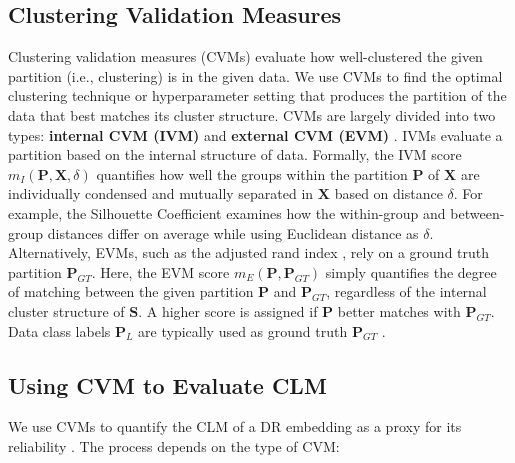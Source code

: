 


\subsection{Clustering Validation Measures}

\label{sec:cvmdesc}

Clustering validation measures (CVMs) evaluate how well-clustered the given partition (i.e., clustering) is in the given data. 
We use CVMs to find the optimal clustering technique or hyperparameter setting that produces the partition of the data that best matches its cluster structure.
CVMs are largely divided into two types: \textbf{internal CVM (IVM)}  \cite{liu10icdm, liu13tsmcb} and \textbf{external CVM (EVM)} \cite{wu09kdd}. 
IVMs evaluate a partition based on the internal structure of data.
Formally, the IVM score $m_{I}(\mathbf{P}, \mathbf{X}, \delta)$ quantifies how well the groups within the partition $\mathbf{P}$ of $\mathbf{X}$ are individually condensed and mutually separated in $\mathbf{X}$ based on  distance $\delta$. 
For example, the Silhouette Coefficient \cite{rousseuw87silhouette} examines how the within-group and between-group distances differ on average while using Euclidean distance as $\delta$. 
Alternatively, EVMs, such as the adjusted rand index \cite{vinh09icml}, rely on a ground truth partition $\mathbf{P}_{GT}$.
Here, the EVM score $m_{E}(\mathbf{P}, \mathbf{P}_{GT})$ simply quantifies the degree of matching between the given partition $\mathbf{P}$ and $\mathbf{P}_{GT}$, regardless of the internal cluster structure of $\mathbf{S}$. A higher score is assigned if $\mathbf{P}$ better matches with $\mathbf{P}_{GT}$. Data class labels $\mathbf{P}_L$ are typically used as ground truth $\mathbf{P}_{GT}$ \cite{farber10multiclust, jeon22arxiv2}. 



\subsection{Using CVM to Evaluate CLM}

\label{sec:cvmprocess}

We use CVMs to quantify the CLM of a DR embedding as a proxy for its reliability \cite{joia11lamp, xia22tvcg, becht19nature, yang21cellreports}.
The process depends on the type of CVM:

